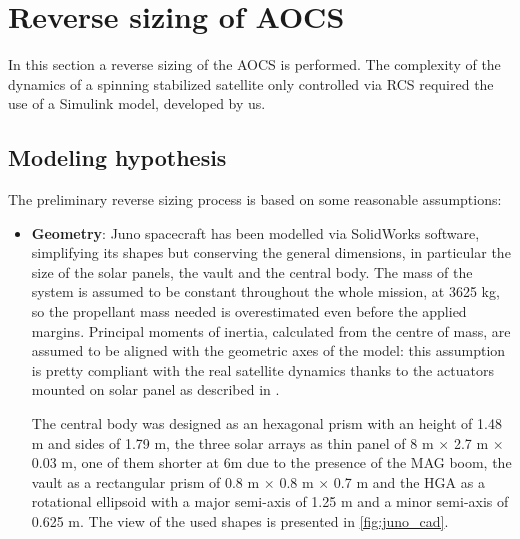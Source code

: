 \section{Reverse sizing of AOCS}
\label{sec:AOCS_sizing}

In this section a reverse sizing of the AOCS is performed. The complexity of the dynamics of a spinning stabilized satellite only controlled via RCS required the use of a Simulink model, developed by us.
\subsection{Modeling hypothesis}
\label{subsec:mod_hypo}
The preliminary reverse sizing process is based on some reasonable assumptions:

\begin{itemize}
    \item
    \begin{minipage}[t]{0.6\linewidth}
        \textbf{Geometry}: Juno spacecraft has been modelled via SolidWorks software, simplifying its shapes but conserving the general dimensions, in particular the size of the solar panels, the vault and the central body. The mass of the system is assumed to be constant throughout the whole mission, at 3625 kg, so the propellant mass needed is overestimated even before the applied margins.     
        Principal moments of inertia, calculated from the centre of mass, are assumed to be aligned with the geometric axes of the model: this assumption is pretty compliant with the real satellite dynamics thanks to the actuators mounted on solar panel as described in \mref. 
       
        The central body was designed as an hexagonal prism with an height of 1.48 m and sides of 1.79 m, the three solar arrays as thin panel of 8 m $\times$ 2.7 m $\times$ 0.03 m, one of them shorter at 6m due to the presence of the MAG boom, the vault as a rectangular prism of 0.8 m $\times$ 0.8 m $\times$ 0.7 m and the HGA as a rotational ellipsoid with a major semi-axis of 1.25 m and a minor semi-axis of 0.625 m. 
        The view of the used shapes is presented in \autoref{fig:juno_cad}.
    \end{minipage}\hfill
    \begin{minipage}[t]{0.4\linewidth}
        \vspace*{-5mm}
    \end{minipage}


\end{itemize}
